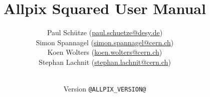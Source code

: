 \newcommand{\addlicense}{
\begin{table}[H]
\centering
\renewcommand{\arraystretch}{1.5}%
\begin{tabular}{>{\centering\arraybackslash}m{.10\textwidth}>{\raggedright\arraybackslash}m{.90\textwidth}}
 \Large{\ccby} & \footnotesize{This manual is licensed under the Creative Commons Attribution 4.0 International License.
 \newline To view a copy of this license, visit \url{http://creativecommons.org/licenses/by/4.0/}.} \\
\end{tabular}
\end{table}
}

\newsavebox{\hugowarningbox}
\newenvironment{hugowarning}
  {\newcommand\colboxcolor{LightPink}%
   \begin{lrbox}{\hugowarningbox}%
   \begin{minipage}{\dimexpr\linewidth-2em\relax}}
  {\end{minipage}\end{lrbox}%
   \begin{center}
     \setlength\fboxsep{0pt}
     \colorbox{\colboxcolor}{\setlength\fboxsep{1em}\fbox{\usebox{\hugowarningbox}}}
  \end{center}}
\newsavebox{\hugoinfobox}
\newenvironment{hugoinfo}
  {\newcommand\colboxcolor{LightBlue}%
    \begin{lrbox}{\hugoinfobox}%
    \begin{minipage}{\dimexpr\linewidth-2em\relax}}
  {\end{minipage}\end{lrbox}%
    \begin{center}
      \setlength\fboxsep{0pt}
      \colorbox{\colboxcolor}{\setlength\fboxsep{1em}\fbox{\usebox{\hugoinfobox}}}
  \end{center}}





\titlehead{\centering\texttt{[image: @DOCS\_ALLPIX\_LOGO@]}}
\title{\textbf{Allpix Squared} User Manual}
\author{
  Paul Schütze (\href{mailto:paul.schuetze@desy.de}{paul.schuetze@desy.de})\\
  Simon Spannagel (\href{mailto:simon.spannagel@cern.ch}{simon.spannagel@cern.ch})\\
  Koen Wolters (\href{mailto:koen.wolters@cern.ch}{koen.wolters@cern.ch})\\
  Stephan Lachnit (\href{mailto:stephan.lachnit@cern.ch}{stephan.lachnit@cern.ch})
}
\date{\\ \vspace{10pt} Version \lstinline!@ALLPIX_VERSION@!}
